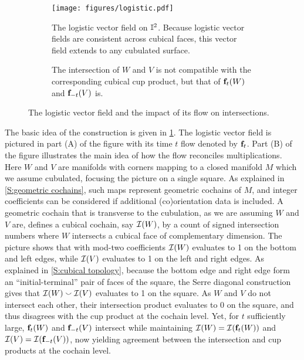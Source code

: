 \begin{figure}[h]
	\centering
	\hfill
	\begin{subfigure}[b]{0.45\textwidth}
		\hspace*{-9pt}
		\texttt{[image: figures/logistic.pdf]}
		\caption{The logistic vector field on $\mathbb{I}^2$. Because logistic vector fields are consistent across cubical faces, this vector field extends to any cubulated surface.}
	\end{subfigure}
	\hspace{0.2 in}
	\begin{subfigure}[b]{0.45\textwidth}
		\raisebox{9.5pt}{}
		\caption{The intersection of $W$ and $V$ is not compatible with the corresponding cubical cup product, but that of $\mathbf{f}_t(W)$ and $\mathbf{f}_{-t}(V)$ is.}
	\end{subfigure}
	\caption{The logistic vector field and the impact of its flow on intersections.}
	\label{F:logistic}
\end{figure}

The basic idea of the construction is given in \cref{F:logistic}.
The logistic vector field is pictured in part (A) of the figure with its time $t$ flow denoted by $\mathbf{f}_t$.
Part (B) of the figure illustrates the main idea of how the flow reconciles multiplications.
Here $W$ and $V$ are manifolds with corners mapping to a closed manifold $M$ which we assume cubulated, focusing the picture on a single square.
As explained in \cref{S:geometric cochains}, such maps represent geometric cochains of $M$, and integer coefficients can be considered if additional (co)orientation data is included.
A geometric cochain that is transverse to the cubulation, as we are assuming $W$ and $V$ are, defines a cubical cochain, say $\mathcal{I}(W)$, by a count of signed intersection numbers where $W$ intersects a cubical face of complementary dimension.
The picture shows that with mod-two coefficients $\mathcal{I}(W)$ evaluates to 1 on the bottom and left edges, while $\mathcal{I}(V)$ evaluates to 1 on the left and right edges.
As explained in \cref{S:cubical topology}, because the bottom edge and right edge form an ``initial-terminal'' pair of faces of the square, the Serre diagonal construction gives that $\mathcal{I}(W) \smallsmile \mathcal{I}(V)$ evaluates to 1 on the square.
As $W$ and $V$ do not intersect each other, their intersection product evaluates to 0 on the square, and thus disagrees with the cup product at the cochain level.
Yet, for $t$ sufficiently large, $\mathbf{f}_t(W)$ and $\mathbf{f}_{-t}(V)$ intersect while maintaining $\mathcal{I}(W) = \mathcal{I}(\mathbf{f}_t(W))$ and $\mathcal{I}(V) = \mathcal{I}(\mathbf{f}_{-t}(V))$, now yielding agreement between the intersection and cup products at the cochain level.

